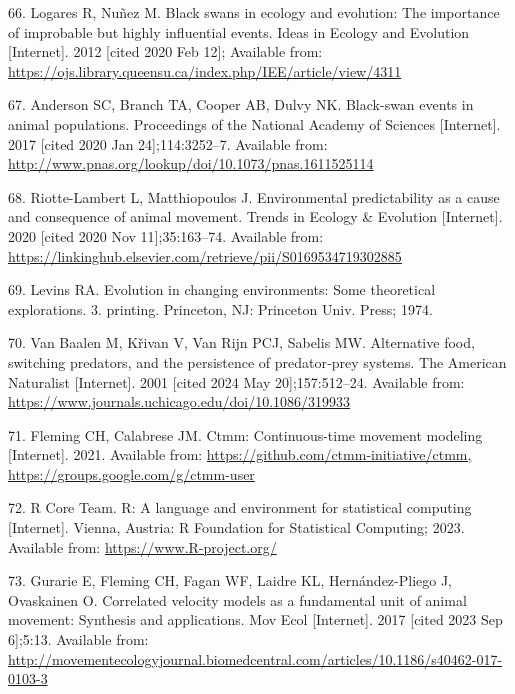 \documentclass[
  12pt,
]{article}
\newlength{\cslhangindent}
\newenvironment{CSLReferences}[2] %
 {\begin{list}{}{%
  \setlength{\itemindent}{0pt}
  \setlength{\leftmargin}{0pt}
  \setlength{\parsep}{0pt}
  \ifodd #1
   \setlength{\leftmargin}{\cslhangindent}
   \setlength{\itemindent}{-1\cslhangindent}
  \fi
  \setlength{\itemsep}{#2\baselineskip}}}
 {\end{list}}
\begin{document}
\begin{CSLReferences}{0}{1}
66. Logares R, Nuñez M. Black swans in ecology and evolution: The importance of improbable but highly influential events. Ideas in Ecology and Evolution {[}Internet{]}. 2012 {[}cited 2020 Feb 12{]}; Available from: \url{https://ojs.library.queensu.ca/index.php/IEE/article/view/4311}

67. Anderson SC, Branch TA, Cooper AB, Dulvy NK. Black-swan events in animal populations. Proceedings of the National Academy of Sciences {[}Internet{]}. 2017 {[}cited 2020 Jan 24{]};114:3252--7. Available from: \url{http://www.pnas.org/lookup/doi/10.1073/pnas.1611525114}

68. Riotte-Lambert L, Matthiopoulos J. Environmental predictability as a cause and consequence of animal movement. Trends in Ecology \& Evolution {[}Internet{]}. 2020 {[}cited 2020 Nov 11{]};35:163--74. Available from: \url{https://linkinghub.elsevier.com/retrieve/pii/S0169534719302885}

69. Levins RA. Evolution in changing environments: Some theoretical explorations. 3. printing. Princeton, {NJ}: Princeton Univ. Press; 1974.

70. Van Baalen M, Křivan V, Van Rijn PCJ, Sabelis MW. Alternative food, switching predators, and the persistence of predator‐prey systems. The American Naturalist {[}Internet{]}. 2001 {[}cited 2024 May 20{]};157:512--24. Available from: \url{https://www.journals.uchicago.edu/doi/10.1086/319933}

71. Fleming CH, Calabrese JM. Ctmm: Continuous-time movement modeling {[}Internet{]}. 2021. Available from: \href{https://github.com/ctmm-initiative/ctmm,\%20https://groups.google.com/g/ctmm-user}{https://github.com/ctmm-initiative/ctmm, https://groups.google.com/g/ctmm-user}

72. R Core Team. R: A language and environment for statistical computing {[}Internet{]}. Vienna, Austria: R Foundation for Statistical Computing; 2023. Available from: \url{https://www.R-project.org/}

73. Gurarie E, Fleming CH, Fagan WF, Laidre KL, Hernández-Pliego J, Ovaskainen O. Correlated velocity models as a fundamental unit of animal movement: Synthesis and applications. Mov Ecol {[}Internet{]}. 2017 {[}cited 2023 Sep 6{]};5:13. Available from: \url{http://movementecologyjournal.biomedcentral.com/articles/10.1186/s40462-017-0103-3}


\end{CSLReferences}
\end{document}
